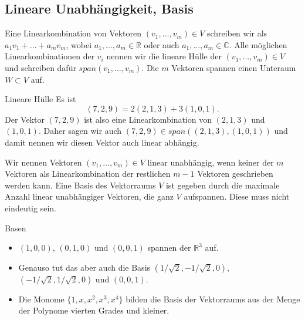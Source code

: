  \subsection{Lineare Unabhängigkeit, Basis}
Eine Linearkombination von Vektoren $(v_1,\dots,v_m)\in V$ schreiben wir als
$a_1v_1+\dots+a_mv_m$, wobei $a_1,\dots,a_m\in\mathbb{R}$ oder auch
$a_1,\dots,a_m\in\mathbb{C}$. Alle möglichen Linearkombinationen der $v_i$
nennen wir die lineare Hülle der $(v_1,\dots,v_m)\in V$ und schreiben dafür
$span(v_1,\dots,v_m)$. Die $m$ Vektoren spannen einen Unteraum $W\subset V$
auf.
\begin{example}{Lineare Hülle}
Es ist
\[(7,2,9)=2(2,1,3)+3(1,0,1). \]
Der Vektor $(7,2,9)$ ist also eine Linearkombination von $(2,1,3)$ und
$(1,0,1)$.  Daher sagen wir auch $(7,2,9)\in span\left( (2,1,3),(1,0,1)
\right)$ und damit nennen wir diesen Vektor auch linear abhängig.
\end{example}
Wir nennen Vektoren $(v_1,\dots,v_m)\in V$ linear unabhängig, wenn keiner der
$m$ Vektoren als Linearkombination der restlichen $m-1$ Vektoren geschrieben
werden kann. Eine Basis des Vektorraums $V$ ist gegeben durch die maximale
Anzahl linear unabhängiger Vektoren, die ganz $V$ aufspannen. Diese muss nicht
eindeutig sein.
\begin{example}{Basen}
  \begin{itemize}
    \item $(1,0,0)$, $(0,1,0)$ und $(0,0,1)$ spannen der $\mathbb{R}^3$ auf. 
    \item Genauso tut das aber auch die Basis
      $(1/\sqrt{2},-1/\sqrt{2},0)$,$(-1/\sqrt{2},1/\sqrt{2},0)$ und $(0,0,1)$.
    \item Die Monome $\{1,x,x^2,x^3,x^4\}$ bilden die Basis der Vektorraums aus
      der Menge der Polynome vierten Grades und kleiner.
  \end{itemize}
\end{example}

